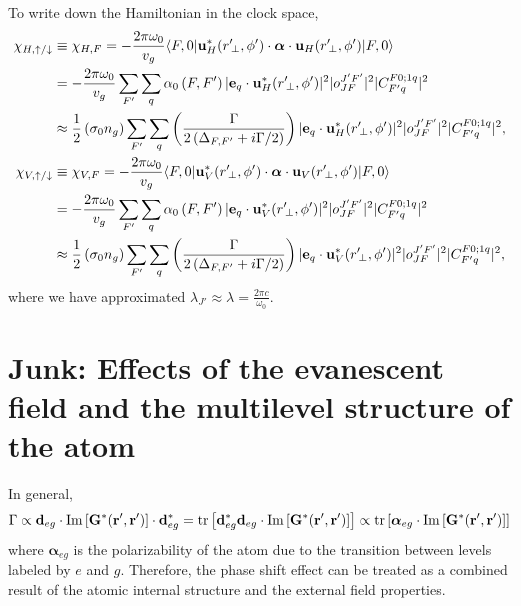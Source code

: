 \documentclass[preprint,aps,pra,onecolumn]{revtex4-1} %
\renewcommand{\tensor}[1]{\boldsymbol{#1}}
\begin{document}
To write down the Hamiltonian in the clock space,
\begin{align}
\chi_{H,\uparrow/\downarrow} & \equiv \chi_{H,F} =- \frac{2\pi \omega_0}{v_g} \bra{F,0} 
	\mathbf{u}^*_H(r^\prime\!_\perp, \phi') \cdot \tensor{\alpha} \cdot 
	\mathbf{u}_{H}(r^\prime\!_\perp, 
	\phi') \ket{F,0} \\
	& =- \frac{2\pi \omega_0}{v_g} \sum_{F'} \sum_q \alpha_0\left( F,F'  \right) |\mathbf{e}_q \cdot 
	\mathbf{u}_H^*(r^\prime\!_\perp,\phi')|^2 |o^{J'F'}_{JF} |^2 
	|C^{F 0;1q}_{F' q}|^2\\
	& \approx  \frac{1}{2} \left( \sigma_0 n_g  \right) \sum_{F'} \sum_q\left( 
		\frac{\Gamma}{2 
		\left(\Delta_{F,F'}+i\Gamma/2\right) }  \right) |\mathbf{e}_q \cdot 
		\mathbf{u}_H^*(r^\prime\!_\perp,\phi')|^2 |o^{J'F'}_{JF} |^2 
		|C^{F 0;1q}_{F' q}|^2,\\
\chi_{V,\uparrow/\downarrow} & \equiv \chi_{V,F} =- \frac{2\pi \omega_0}{v_g} \bra{F,0} 
	\mathbf{u}^*_V(r^\prime\!_\perp, \phi') \cdot \tensor{\alpha} \cdot 
	\mathbf{u}_{V}(r^\prime\!_\perp, 
	\phi') \ket{F,0} \\
	& =- \frac{2\pi \omega_0}{v_g} \sum_{F'} \sum_q \alpha_0\left( F,F'  \right) |\mathbf{e}_q \cdot 
	\mathbf{u}_V^*(r^\prime\!_\perp,\phi')|^2 |o^{J'F'}_{JF} |^2 
	|C^{F 0;1q}_{F' q}|^2\\
	& \approx  \frac{1}{2} \left( \sigma_0 n_g  \right) \sum_{F'} \sum_q\left( 
		\frac{\Gamma}{2 
		\left(\Delta_{F,F'}+i\Gamma/2\right) }  \right) |\mathbf{e}_q \cdot 
		\mathbf{u}_V^*(r^\prime\!_\perp,\phi')|^2 |o^{J'F'}_{JF} |^2 
		|C^{F 0;1q}_{F' q}|^2,\\
\end{align}
where we have approximated $ \lambda_{J'}\approx \lambda = \frac{2\pi c}{\omega_0} $. 


\section{Junk: Effects of the evanescent field and the multilevel structure of the atom}
In general, 
\begin{align}
\Gamma \propto \mathbf{d}_{eg}\cdot \mathrm{Im}\left[\mathbf{G}^*(\mathbf{r}',\mathbf{r}') \right]\cdot\mathbf{d}_{eg}^*=\mathrm{tr}\left[\mathbf{d}_{eg}^*\mathbf{d}_{eg}\cdot \mathrm{Im}\left[\mathbf{G}^*(\mathbf{r}',\mathbf{r}') \right] \right]\propto \mathrm{tr}\left[\boldsymbol{\alpha}_{eg}\cdot \mathrm{Im}\left[\mathbf{G}^*(\mathbf{r}',\mathbf{r}') \right] \right]
\end{align}
where $ \boldsymbol{\alpha}_{eg} $ is the polarizability of the atom due to the transition between levels labeled by $ e$ and $g $. Therefore, the phase shift effect can be treated as a combined result of the atomic internal structure and the external field properties. 
\end{document}
